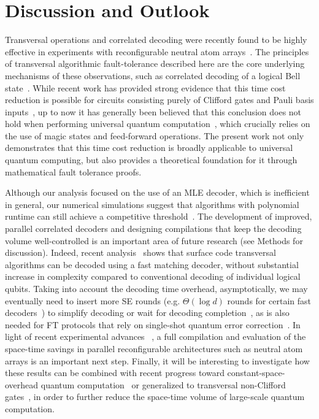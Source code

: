 \documentclass[prl,twocolumn,superscriptaddress,secnumarabic,balancelastpage,amsmath,amssymb]{revtex4-2}
\begin{document}
\section*{Discussion and Outlook}
Transversal operations and correlated decoding were recently found to be highly effective in experiments with reconfigurable  
neutral atom arrays~\cite{bluvstein2024logical}.
%
The principles of transversal algorithmic fault-tolerance described here are the core underlying mechanisms of these observations, such as correlated decoding of a logical Bell state~\cite{bluvstein2024logical}.
%
While recent work has provided strong evidence that this time cost reduction is possible for circuits consisting purely of Clifford gates and Pauli basis inputs~\cite{cain2024correlated}, up to now it has generally been believed that this conclusion does not hold when performing universal quantum computation~\cite{beverland2021cost,cai2023looped,duckering2020virtualized}, which crucially relies on the use of magic states and feed-forward operations.
%
The present work not only demonstrates that this time cost reduction is broadly applicable to universal quantum computing, but also provides a theoretical foundation for it through mathematical fault tolerance proofs.

Although our analysis focused on the use of an MLE decoder, which is inefficient in general, our numerical simulations suggest that algorithms with polynomial runtime can still achieve a competitive threshold~\cite{SM}. 
%
The development of improved, parallel correlated decoders and designing compilations that keep the decoding volume well-controlled is an important area of future research (see Methods for discussion).
%
Indeed, recent analysis~\cite{cain2025fast,serra-peralta2025decoding,turner2025scalable} shows that surface code transversal algorithms can be decoded using a fast matching decoder, without substantial increase in complexity compared to conventional decoding of individual logical qubits.
%
Taking into account the decoding time overhead, asymptotically, we may eventually need to insert more SE rounds (e.g. $\Theta(\log d)$ rounds for certain fast decoders~\cite{fowler2015minimum,duclos-cianci2010fast}) to simplify decoding or wait for decoding completion~\cite{terhal2015quantum}, as is also needed for FT protocols that rely on single-shot quantum error correction~\cite{bombin2015single}.
%
In light of recent experimental advances
~\cite{bluvstein2024logical}, a full compilation and evaluation of the space-time savings in parallel reconfigurable architectures such as neutral atom arrays is an important next step.
%
Finally, it will be interesting to investigate how these results can be combined with recent progress toward constant-space-overhead quantum computation~\cite{gottesman2013fault,breuckmann2021quantum,tillich2014quantum,panteleev2022asymptotically,tremblay2022constant,xu2024constant,fawzi2018constant,gu2024single} or generalized to transversal non-Clifford gates~\cite{bombin2015gauge,beverland2021cost,kubica2015unfolding,vasmer2019three,brown2020fault,bombin2018transversal,zhu2023non}, in order to further reduce the space-time volume of large-scale quantum computation.
\end{document}
